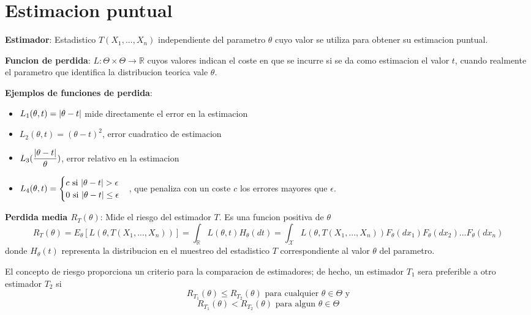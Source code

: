 \documentclass[10pt]{extarticle}
\newcommand{\R}{\mathbb{R}}
\newcommand{\<}{\langle}
\renewcommand{\>}{\rangle}
\theoremstyle{definition}
\begin{document}
\newpage

\section{Estimacion puntual}

\textbf{Estimador}: Estadistico $T(X_1, ..., X_n)$ independiente del parametro $\theta$ cuyo valor se utiliza para obtener su estimacion puntual.

\textbf{Funcion de perdida}: $L : \Theta \times \Theta \rightarrow \R$ cuyos valores indican el coste en que se incurre si se da como estimacion el valor $t$, cuando realmente el parametro que identifica la distribucion teorica vale $\theta$.

\textbf{Ejemplos de funciones de perdida}:
\begin{itemize}
  \item $L_1(\theta, t) = \abs{\theta - t}$ mide directamente el error en la estimacion
  \item $L_2(\theta, t) = (\theta - t)^2$, error cuadratico de estimacion
  \item $L_3(\dfrac{\abs{\theta - t}}{\theta})$, error relativo en la estimacion
  \item $L_4(\theta, t)= \begin{cases}
            c \text{ si } \abs{\theta - t} > \epsilon \\
            0 \text{ si } \abs{\theta - t} \leq \epsilon
          \end{cases}$, que penaliza con un coste $c$ los errores mayores que $\epsilon$.
\end{itemize}

\textbf{Perdida media $R_T(\theta)$}: Mide el riesgo del estimador $T$. Es una funcion positiva de $\theta$
\begin{equation*}
  R_T(\theta)=E_\theta[L(\theta, T(X_1,..., X_n))]=\int_\R L(\theta, t)H_\theta(dt)= \int_\mathcal{X}L(\theta, T(X_1,..., X_n))F_\theta(dx_1) F_\theta(dx_2)...F_\theta(dx_n)
\end{equation*}
donde $H_\theta(t)$ representa la distribucion en el muestreo del estadistico $T$ correspondiente al valor $\theta$ del parametro.

El concepto de riesgo proporciona un criterio para la comparacion de estimadores; de hecho, un estimador $T_1$ sera preferible a otro estimador $T_2$ si
\begin{equation*}
  R_{T_1}(\theta) \leq R_{T_2}(\theta) \text{ para cualquier } \theta \in \Theta \text{ y}
\end{equation*}
\begin{equation*}
  R_{T_1}(\theta) < R_{T_2}(\theta) \text{ para algun } \theta \in \Theta
\end{equation*}
\end{document}
